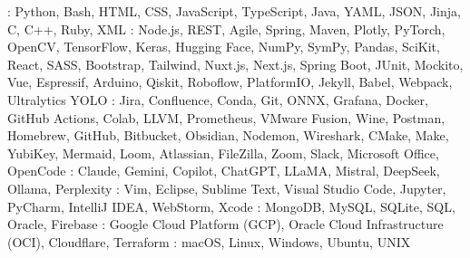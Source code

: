 
    {: Python, Bash, HTML, CSS, JavaScript, TypeScript, Java, YAML, JSON, Jinja, C, C++, Ruby, XML}
    {: Node.js, REST, Agile, Spring, Maven, Plotly, PyTorch, OpenCV, TensorFlow, Keras, Hugging Face, NumPy, SymPy, Pandas, SciKit, React, SASS, Bootstrap, Tailwind, Nuxt.js, Next.js, Spring Boot, JUnit, Mockito, Vue, Espressif, Arduino, Qiskit, Roboflow, PlatformIO, Jekyll, Babel, Webpack, Ultralytics YOLO}
    {: Jira, Confluence, Conda, Git, ONNX, Grafana, Docker, GitHub Actions, Colab, LLVM, Prometheus, VMware Fusion, Wine, Postman, Homebrew, GitHub, Bitbucket, Obsidian, Nodemon, Wireshark, CMake, Make, YubiKey, Mermaid, Loom, Atlassian, FileZilla, Zoom, Slack, Microsoft Office, OpenCode}
    {: Claude, Gemini, Copilot, ChatGPT, LLaMA, Mistral, DeepSeek, Ollama, Perplexity}
    {: Vim, Eclipse, Sublime Text, Visual Studio Code, Jupyter, PyCharm, IntelliJ IDEA, WebStorm, Xcode}
    {: MongoDB, MySQL, SQLite, SQL, Oracle, Firebase}
    {: Google Cloud Platform (GCP), Oracle Cloud Infrastructure (OCI), Cloudflare, Terraform}
    {: macOS, Linux, Windows, Ubuntu, UNIX}